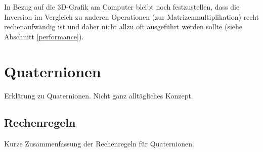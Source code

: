 In Bezug auf die 3D-Grafik am Computer bleibt noch festzustellen, dass die Inversion im Vergleich zu anderen Operationen (\zb zur Matrizenmultiplikation) recht rechenaufwändig ist und daher nicht allzu oft ausgeführt werden sollte (siehe Abschnitt \ref{performance}).

\section{Quaternionen}
Erklärung zu Quaternionen. Nicht ganz alltägliches Konzept.

\subsection{Rechenregeln}
Kurze Zusammenfassung der Rechenregeln für Quaternionen.